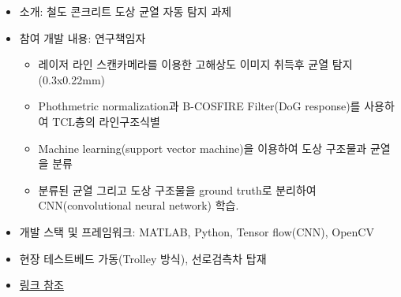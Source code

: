 
\begin{itemize}
	\item 소개: 철도 콘크리트 도상 균열 자동 탐지 과제
	\item 참여 개발 내용: 연구책임자
	      \begin{itemize}
		      \item 레이저 라인 스캔카메라를 이용한 고해상도 이미지 취득후 균열 탐지 (0.3x0.22mm)
		      \item Phothmetric normalization과 B-COSFIRE Filter(DoG response)를 사용하여 TCL층의 라인구조식별
		      \item Machine learning(support vector machine)을 이용하여 도상 구조물과 균열을 분류
		      \item 분류된 균열 그리고 도상 구조물을 ground truth로 분리하여 CNN(convolutional neural network) 학습.
	      \end{itemize}
	\item 개발 스택 및 프레임워크: MATLAB, Python, Tensor flow(CNN), OpenCV
	\item 현장 테스트베드 가동(Trolley 방식), 선로검측차 탑재
	\item \href{https://www.eunchurn.com/blog/engineering/2017-12-30-concrete-cracks-detection-using-b-cosfire-filter}{링크 참조}
\end{itemize}

